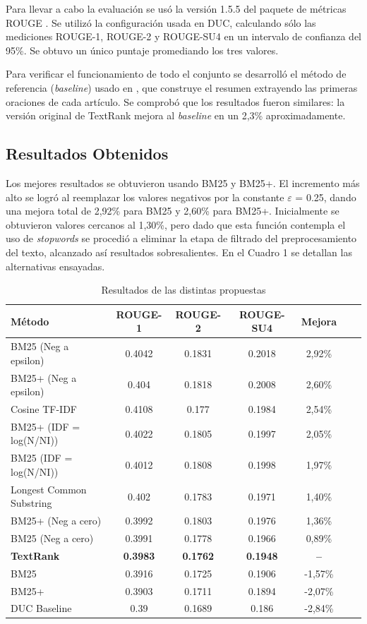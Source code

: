 \documentclass{llncs}
\begin{document}
Para llevar a cabo la evaluación se usó la versión 1.5.5 del paquete de métricas ROUGE \cite{Lin2004a}. Se utilizó la configuración usada en DUC, calculando sólo las mediciones ROUGE-1, ROUGE-2 y ROUGE-SU4 en un intervalo de confianza del 95\%. Se obtuvo un único puntaje promediando los tres valores.

Para verificar el funcionamiento de todo el conjunto se desarrolló el método de referencia (\textit{baseline}) usado en \cite{mihalcea-tarau}, que construye el resumen extrayendo las primeras oraciones de cada artículo. Se comprobó que los resultados fueron similares: la versión original de TextRank mejora al \textit{baseline} en un 2,3\% aproximadamente.


\subsection{Resultados Obtenidos}
Los mejores resultados se obtuvieron usando BM25 y BM25+. El incremento más alto se logró al reemplazar los valores negativos por la constante $\varepsilon$ = 0.25, dando una mejora total de 2,92\% para BM25 y 2,60\% para BM25+. Inicialmente se obtuvieron valores cercanos al 1,30\%, pero dado que esta función contempla el uso de \textit{stopwords} se procedió a eliminar la etapa de filtrado del preprocesamiento del texto, alcanzado así resultados sobresalientes. En el Cuadro 1 se detallan las alternativas ensayadas.

\begin{table}
\caption{Resultados de las distintas propuestas}
\begin{center}
\begin{tabular}{l*{5}{c}r}
\hline
\rule{0pt}{12pt}
Método & ROUGE-1 & ROUGE-2 & ROUGE-SU4 & Mejora \\[2pt]
\hline\rule{0pt}{12pt}\mbox{}\par\nobreak
BM25 (Neg a epsilon) & 0.4042 & 0.1831 & 0.2018 & 2,92\% \\
BM25+ (Neg a epsilon) & 0.404 & 0.1818 & 0.2008 & 2,60\% \\
Cosine TF-IDF & 0.4108 & 0.177 & 0.1984 & 2,54\% \\
BM25+ (IDF = log(N/NI)) & 0.4022 & 0.1805 & 0.1997 & 2,05\% \\ 
BM25 (IDF = log(N/NI)) & 0.4012 & 0.1808 & 0.1998 & 1,97\% \\ 
Longest Common Substring & 0.402 & 0.1783 & 0.1971 & 1,40\% \\
BM25+ (Neg a cero) & 0.3992 & 0.1803 & 0.1976 & 1,36\% \\ 
BM25 (Neg a cero) & 0.3991 & 0.1778 & 0.1966 & 0,89\% \\
\textbf{TextRank} & \textbf{0.3983} & \textbf{0.1762} & \textbf{0.1948} & \textbf{--}\\
BM25 & 0.3916 & 0.1725 & 0.1906 & -1,57\% \\
BM25+ & 0.3903 & 0.1711 & 0.1894 & -2,07\% \\
DUC Baseline & 0.39 & 0.1689 & 0.186 & -2,84\% \\ [2pt]
\hline
\end{tabular}
\end{center}
\end{table}
\end{document}
